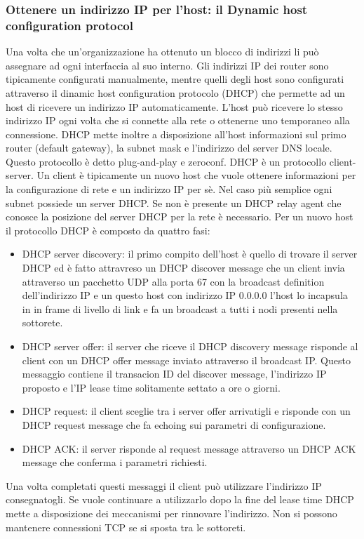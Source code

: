 \subsubsection{Ottenere un indirizzo IP per l'host: il Dynamic host configuration protocol}
Una volta che un'organizzazione ha ottenuto un blocco di indirizzi li pu\`o assegnare ad ogni interfaccia al suo interno. Gli indirizzi IP dei router sono
tipicamente configurati manualmente, mentre quelli degli host sono configurati attraverso il dinamic host configuration protocolo (DHCP) che permette ad un
host di ricevere un indirizzo IP automaticamente. L'host pu\`o ricevere lo stesso indirizzo IP ogni volta che si connette alla rete o ottenerne uno
temporaneo alla connessione. DHCP mette inoltre a disposizione all'host informazioni sul primo router (default gateway), la subnet mask e l'indirizzo del
server DNS locale. Questo protocollo \`e detto plug-and-play e zeroconf. DHCP \`e un protocollo client-server. Un client \`e tipicamente un nuovo host che
vuole ottenere informazioni per la configurazione di rete e un indirizzo IP per s\`e. Nel caso pi\`u semplice ogni subnet possiede un server DHCP. Se non 
\`e presente un DHCP relay agent che conosce la posizione del server DHCP per la rete \`e necessario. Per un nuovo host il protocollo DHCP \`e composto da
quattro fasi: 
\begin{itemize}
\item DHCP server discovery: il primo compito dell'host \`e quello di trovare il server DHCP ed \`e fatto attravreso un DHCP discover message che un client
invia attraverso un pacchetto UDP alla porta 67 con la broadcast definition dell'indirizzo IP e un questo host con indirizzo IP 0.0.0.0 l'host lo incapsula
in in frame di livello di link e fa un broadcast a tutti i nodi presenti nella sottorete.
\item DHCP server offer: il server che riceve il DHCP discovery message risponde al client con un DHCP offer message inviato attraverso il broadcast IP. 
Questo messaggio contiene il transacion ID del discover message, l'indirizzo IP proposto e l'IP lease time solitamente settato a ore o giorni. 
\item DHCP request: il client sceglie tra i server offer arrivatigli e risponde con un DHCP request message che fa echoing sui parametri di configurazione.
\item DHCP ACK: il server risponde al request message attraverso un DHCP ACK message che conferma i parametri richiesti. 
\end{itemize}
Una volta completati questi messaggi il client pu\`o utilizzare l'indirizzo IP consegnatogli. Se vuole continuare a utilizzarlo dopo la fine del lease time
DHCP mette a disposizione dei meccanismi per rinnovare l'indirizzo. Non si possono mantenere connessioni TCP se si sposta tra le sottoreti. 
